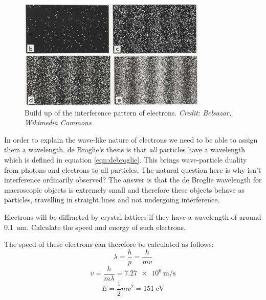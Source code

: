 \documentclass[revision-guide.tex]{subfiles}
\begin{document}
\begin{figure}
  \begin{center}
  \includegraphics[width=0.8\textwidth]{figs/chapt-9/electron-diff.jpg}
\end{center}
  \caption{Build up of the interference pattern of electrons. \emph{Credit: Belsazar, Wikimedia Commons}}
  \label{fig:electron-buildup}
\end{figure}

\clearpage


In order to explain the wave-like nature of electrons we need to be able to assign them a wavelength. de Broglie's thesis is that \emph{all} particles have a wavelength which is defined in equation \ref{eqn:debroglie}. This brings wave-particle duality from photons and electrons to all particles. The natural question here is why isn't interference ordinarily observed? The answer is that the de Broglie wavelength for macroscopic objects is extremely small and therefore these objects behave as particles, travelling in straight lines and not undergoing interference.

\begin{example}
Electrons will be diffracted by crystal lattices if they have a wavelength of around \SI{0.1}{\nano\metre}. Calculate the speed and energy of such electrons.

\answer
The speed of these electrons can therefore be calculated as follows:
\[ \lambda = \frac{h}{p} = \frac{h}{mv} \]
\[ v = \frac{h}{m\lambda} = \SI{7.27e6}{\meter\per\second} \]
\[ E = \frac{1}{2}mv^2 = \SI{151}{\electronvolt} \]

\end{example}
\end{document}
